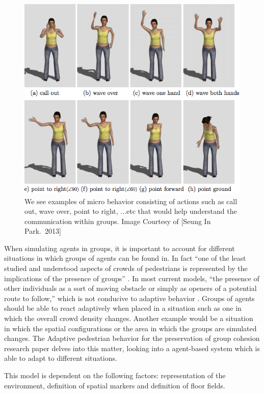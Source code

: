 \documentclass[tog]{acmsiggraph}
\begin{document}
\begin{figure}
\centering
\includegraphics[scale=0.4]{images/parkimage.png}
\caption{We see examples of micro behavior consisting of actions such as call out, wave over, point to right, ...etc that would help understand the communication within groups. Image Courtesy of [Seung In Park.\ 2013] }
  \label{fig:park}
\end{figure}

When simulating agents in groups, it is important to account for different situations in which groups of agents can be found in.  In fact ``one of the least studied and understood aspects of crowds of pedestrians is represented by the implications of the presence of groups'' \cite{vizzari2013adaptiveped}.  In most current models, ``the presence of other individuals as a sort of moving obstacle or simply as openers of a potential route to follow,'' which is not conducive to adaptive behavior \cite{vizzari2013adaptiveped}.  Groups of agents should be able to react adaptively when placed in a situation such as one in which the overall crowd density changes.  Another example would be a situation in which the spatial configurations or the area in which the groups are simulated changes.  The Adaptive pedestrian behavior for the preservation of group cohesion research paper delves into this matter, looking into a agent-based system which is able to adapt to different situations.

This model is dependent on the following factors: representation of the environment, definition of spatial markers and definition of floor fields.
\end{document}
